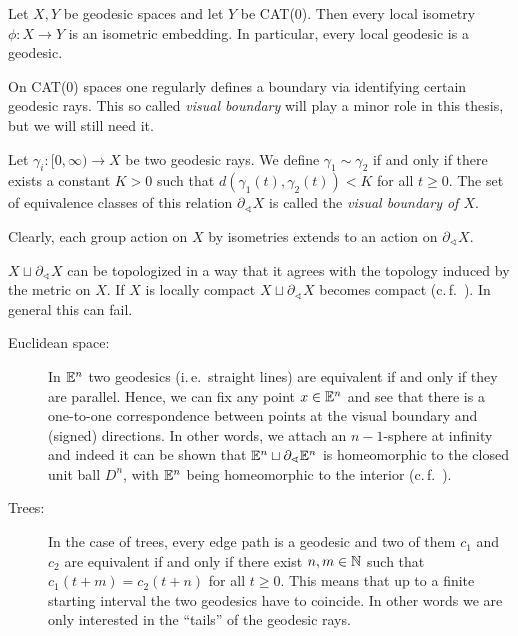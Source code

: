 \begin{prop}
  Let \(X,Y\) be geodesic spaces and let \(Y\) be CAT(0). Then every local isometry \(\phi \colon X \to Y\) is an isometric embedding. In particular, every local geodesic is a geodesic.
\end{prop}

On CAT(0) spaces one regularly defines a boundary via identifying certain geodesic rays. This so called \emph{visual boundary} will play a minor role in this thesis, but we will still need it. 

\begin{defin}
  \label{defin:visual}
  Let \(\gamma_i \colon [0, \infty) \to X\) be two geodesic rays. We define \(\gamma_1 \sim \gamma_2\) if and only if there exists a constant \(K > 0 \) such that \(d(\gamma_1(t), \gamma_2(t)) < K\) for all \(t \geq 0\). The set of equivalence classes of this relation \(\partial_\sphericalangle X\) is called the \emph{visual boundary of \(X\)}.

  Clearly, each group action on \(X\) by isometries extends to an action on \(\partial_\sphericalangle X\).
\end{defin}

\begin{rem}
  \(X \sqcup \partial_{\sphericalangle}X\) can be topologized in a way that it agrees with the topology induced by the metric on \(X\). If \(X\) is locally compact \(X \sqcup \partial_\sphericalangle X\) becomes compact (c.\,f.~\cite[Sec.~II.8]{MR1744486}). In general this can fail.
\end{rem}

\begin{bsp}
  \begin{description}
  \item[Euclidean space:] In \(\mathbb{E}^n\) two geodesics (i.\,e.\ straight lines) are equivalent if and only if they are parallel. Hence, we can fix any point \(x \in \mathbb{E}^n\) and see that there is a one-to-one correspondence between points at the visual boundary and (signed) directions. In other words, we attach an \(n-1\)-sphere at infinity and indeed it can be shown that \(\mathbb{E}^n \sqcup \partial_\sphericalangle \mathbb{E}^n\) is homeomorphic to the closed unit ball \(D^n\), with \(\mathbb{E}^n\) being homeomorphic to the interior (c.\,f.~\cite[Section~II.8]{MR1744486}).
  \item[Trees:] In the case of trees, every edge path is a geodesic and two of them \(c_1\) and \(c_2\) are equivalent if and only if there exist \(n,m \in \mathbb{N}\) such that \(c_1(t+m) = c_2(t+n)\) for all \(t\geq0\). This means that up to a finite starting interval the two geodesics have to coincide. In other words we are only interested in the \enquote{tails} of the geodesic rays.
  \end{description}
\end{bsp}

